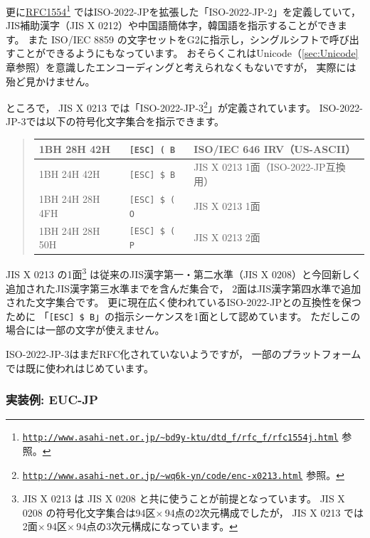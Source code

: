 \documentclass[a4j,10pt,fleqn]{jsarticle}
\begin{document}
更に\href{ftp://ftp.isi.edu/in-notes/rfc1554.txt}{RFC1554}\footnote{
    \href{http://www.asahi-net.or.jp/~bd9y-ktu/dtd_f/rfc_f/rfc1554j.html}{\texttt{http://www.asahi-net.or.jp/\~{}bd9y-ktu/dtd\_f/rfc\_f/rfc1554j.html}} 参照。
} ではISO-2022-JPを拡張した「ISO-2022-JP-2」を定義していて，
JIS補助漢字（JIS X 0212）や中国語簡体字，韓国語を指示することができます。
また ISO/IEC 8859 の文字セットをG2に指示し，シングルシフトで呼び出すことができるようにもなっています。
おそらくこれはUnicode（\ref{sec:Unicode}章参照）を意識したエンコーディングと考えられなくもないですが，
実際には殆ど見かけません。

ところで，
JIS X 0213 では「ISO-2022-JP-3\footnote{
    \href{http://www.asahi-net.or.jp/~wq6k-yn/code/enc-x0213.html}{\texttt{http://www.asahi-net.or.jp/\~{}wq6k-yn/code/enc-x0213.html}} 参照。
}」が定義されています。
ISO-2022-JP-3では以下の符号化文字集合を指示できます。
\begin{quote}\begin{tabular}{|l|l||l|}
    \hline
    1BH 28H 42H     & \texttt{[ESC] ( B}    & ISO/IEC 646 IRV（US-ASCII） \\ \hline
    1BH 24H 42H     & \texttt{[ESC] \$ B}   & JIS X 0213 1面（ISO-2022-JP互換用） \\ \hline
    1BH 24H 28H 4FH & \texttt{[ESC] \$ ( O} & JIS X 0213 1面 \\ \hline
    1BH 24H 28H 50H & \texttt{[ESC] \$ ( P} & JIS X 0213 2面 \\ \hline
\end{tabular}\end{quote}
JIS X 0213 の1面\footnote{
    JIS X 0213 は JIS X 0208 と共に使うことが前提となっています。
    JIS X 0208 の符号化文字集合は94区$\times$\,94点の2次元構成でしたが，
    JIS X 0213 では2面$\times$\,94区$\times$\,94点の3次元構成になっています。
} は従来のJIS漢字第一・第二水準（JIS X 0208）と今回新しく追加されたJIS漢字第三水準までを含んだ集合で，
2面はJIS漢字第四水準で追加された文字集合です。
更に現在広く使われているISO-2022-JPとの互換性を保つために
「\texttt{[ESC] \$ B}」の指示シーケンスを1面として認めています。
ただしこの場合には一部の文字が使えません。

ISO-2022-JP-3はまだRFC化されていないようですが，
一部のプラットフォームでは既に使われはじめています。

\subsubsection{実装例: EUC-JP} \label{sec:euc-jp}
\end{document}
